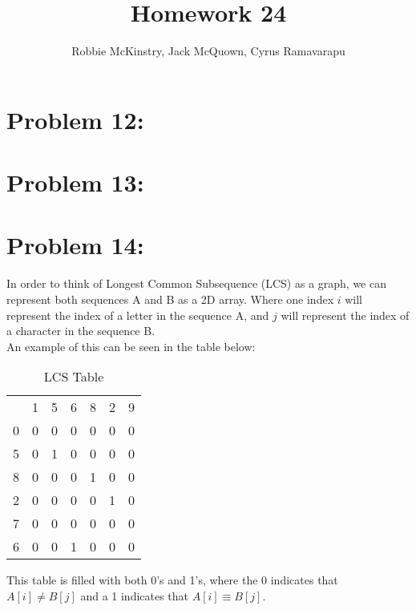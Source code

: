 \documentclass[12pt]{article}
\begin{document}
\title{Homework 24}
\author{Robbie McKinstry, Jack McQuown, Cyrus Ramavarapu}
\renewcommand{\today}{27 October 2016}
\renewcommand{\baselinestretch}{1.5}
\maketitle

\section*{Problem 12: }
\section*{Problem 13: }
\section*{Problem 14: }
In order to think of Longest Common Subsequence (LCS) as a graph, we can represent both sequences A and B as a 2D array. Where one index {$i$} will represent the index of a letter in the sequence A, and {$j$} will represent the index of a character in the sequence B.\\
An example of this can be seen in the table below:
\begin{table}[H]
\centering
\caption{LCS Table}
\label{my-label}
\begin{tabular}{ccccccc}
                       & 1 & 5 & 6 & 8 & 2 & 9 \\ \cline{2-7} 
\multicolumn{1}{c|}{0} & 0 & 0 & 0 & 0 & 0 & 0 \\
\multicolumn{1}{c|}{5} & 0 & 1 & 0 & 0 & 0 & 0 \\
\multicolumn{1}{c|}{8} & 0 & 0 & 0 & 1 & 0 & 0 \\
\multicolumn{1}{c|}{2} & 0 & 0 & 0 & 0 & 1 & 0 \\
\multicolumn{1}{c|}{7} & 0 & 0 & 0 & 0 & 0 & 0 \\
\multicolumn{1}{c|}{6} & 0 & 0 & 1 & 0 & 0 & 0
\end{tabular}
\end{table}
This table is filled with both 0's and 1's, where the 0 indicates that {$A[i] \neq B[j]$} and a 1 indicates that {$A[i] \equiv B[j]$}.\\
\end{document}
